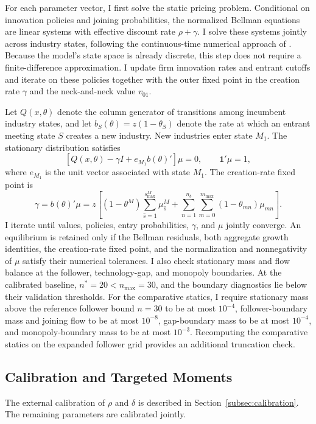 \documentclass[12pt]{article}
\begin{document}
For each parameter vector, I first solve the static pricing problem. Conditional on innovation policies and joining probabilities, the normalized Bellman equations are linear systems with effective discount rate \(\rho+\gamma\). I solve these systems jointly across industry states, following the continuous-time numerical approach of \citet{AchdouHHLM22}. Because the model's state space is already discrete, this step does not require a finite-difference approximation. I update firm innovation rates and entrant cutoffs and iterate on these policies together with the outer fixed point in the creation rate \(\gamma\) and the neck-and-neck value \(v_{01}\).

Let \(Q(x,\theta)\) denote the column generator of transitions among incumbent industry states, and let \(b_S(\theta)=z(1-\theta_S)\) denote the rate at which an entrant meeting state \(S\) creates a new industry. New industries enter state \(M_1\). The stationary distribution satisfies
\[
\left[Q(x,\theta)-\gamma I+e_{M_1}b(\theta)'\right]\mu=0,
\qquad
\mathbf{1}'\mu=1,
\]
where \(e_{M_1}\) is the unit vector associated with state \(M_1\). The creation-rate fixed point is
\[
\gamma=b(\theta)'\mu
=
z\left[
(1-\theta^{M})\sum_{\hat{s}=1}^{s_{\max}^{M}}\mu^{M}_{\hat{s}}
+
\sum_{n=1}^{n_b}\sum_{m=0}^{m_{\max}}
(1-\theta_{mn})\mu_{mn}
\right].
\]
I iterate until values, policies, entry probabilities, \(\gamma\), and \(\mu\) jointly converge. An equilibrium is retained only if the Bellman residuals, both aggregate growth identities, the creation-rate fixed point, and the normalization and nonnegativity of \(\mu\) satisfy their numerical tolerances. I also check stationary mass and flow balance at the follower, technology-gap, and monopoly boundaries. At the calibrated baseline, \(n^*=20<n_{\max}=30\), and the boundary diagnostics lie below their validation thresholds. For the comparative statics, I require stationary mass above the reference follower bound \(n=30\) to be at most \(10^{-4}\), follower-boundary mass and joining flow to be at most \(10^{-8}\), gap-boundary mass to be at most \(10^{-4}\), and monopoly-boundary mass to be at most \(10^{-3}\). Recomputing the comparative statics on the expanded follower grid provides an additional truncation check.

\subsection{Calibration and Targeted Moments}\label{app:calibration}

The external calibration of \(\rho\) and \(\delta\) is described in Section~\ref{subsec:calibration}. The remaining parameters are calibrated jointly.
\end{document}
